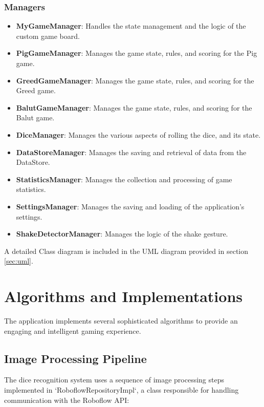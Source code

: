 \subsubsection{Managers}
\begin{itemize}
    \item \textbf{MyGameManager}: Handles the state management and the logic of the custom game board.
    \item \textbf{PigGameManager}: Manages the game state, rules, and scoring for the Pig game.
     \item \textbf{GreedGameManager}: Manages the game state, rules, and scoring for the Greed game.
    \item \textbf{BalutGameManager}: Manages the game state, rules, and scoring for the Balut game.
     \item \textbf{DiceManager}: Manages the various aspects of rolling the dice, and its state.
    \item \textbf{DataStoreManager}: Manages the saving and retrieval of data from the DataStore.
     \item \textbf{StatisticsManager}: Manages the collection and processing of game statistics.
    \item \textbf{SettingsManager}: Manages the saving and loading of the application's settings.
     \item \textbf{ShakeDetectorManager}: Manages the logic of the shake gesture.
\end{itemize}

\vspace{0.2cm}
A detailed Class diagram is included in the UML diagram provided in section \ref{sec:uml}.

\section{Algorithms and Implementations}

The application implements several sophisticated algorithms to provide an engaging and intelligent gaming experience. 

\subsection{Image Processing Pipeline}

The dice recognition system uses a sequence of image processing steps implemented in `RoboflowRepositoryImpl`, a class responsible for handling communication with the Roboflow API:
